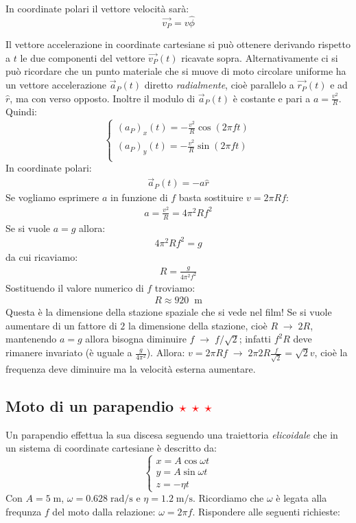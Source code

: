 \documentclass[12pt,a4paper]{book}
\newcommand{\rstar}{ \textcolor{red}{$\star$}}
\begin{document}
In coordinate polari il vettore velocità sarà: 
%
\begin{equation*}
\vec{v_P}= v\hat{\phi}
\end{equation*}
%

Il vettore accelerazione in coordinate cartesiane si può ottenere derivando rispetto a $t$ le due componenti del vettore $\vec{v_P}(t)$ ricavate sopra. Alternativamente
ci si può ricordare che un punto materiale che si muove di moto circolare uniforme ha un vettore accelerazione $\vec{a}_P(t)$ diretto \textit{radialmente}, cioè parallelo a $\vec{r_P}(t)$ e ad $\hat{r}$, ma con verso opposto.  Inoltre il modulo di $\vec{a}_P(t)$ è costante e pari a $a=\frac{v^2}{R}$.  
Quindi: 
%
\begin{equation*}
 \left\{\begin{array}{lr}
  (a_P)_x(t)=-\frac{v^2}{R}  \cos(2 \pi f t)\\
  (a_P)_y(t)= - \frac{v^2}{R}  \sin(2 \pi f t)\\
        \end{array}\right.
\end{equation*}
%
In coordinate polari:
\begin{gather*}
\vec{a}_P(t)=-a\hat{r}
\end{gather*}
%
Se vogliamo esprimere $a$ in funzione di $f$ basta sostituire $v=2 \pi R f$: 
%
\begin{gather*}
a=\frac{v^2}{R}= 4 \pi^2 R f^2
\end{gather*}
%
Se si vuole $a=g$ allora:
%
\begin{gather*}
4 \pi^2 R f^2=g 
\end{gather*}
%
da cui ricaviamo: 
%
\begin{gather*}
R=\frac{g}{4 \pi^2 f^2} 
\end{gather*}
%
Sostituendo il valore numerico di $f$ troviamo: 
%
\begin{gather*}
R \approx 920 \; \; \text{m} 
\end{gather*}
%
Questa è la dimensione della stazione spaziale che si vede nel film! Se si vuole aumentare di un fattore di $2$ la dimensione della stazione, cioè $R \; \rightarrow \;2R$, mantenendo $a=g$ allora bisogna diminuire $f \; \rightarrow \; f/\sqrt{2}$; infatti $f^2 R$ deve rimanere invariato (è uguale a $\frac{g}{4 \pi^2}$). Allora: $v=2 \pi R f \; \rightarrow \;  2 \pi 2R \frac{f}{\sqrt{2}}=\sqrt{2}v$, cioè la frequenza deve diminuire ma la velocità esterna aumentare.

\subsection{Moto di un parapendio \rstar\rstar\rstar} 
Un parapendio effettua la sua discesa seguendo una traiettoria \textit{elicoidale} che in un sistema di coordinate cartesiane è descritto da:
%
\[
\begin{cases}
	x=A\cos\omega t \\
    y=A\sin\omega t \\
    z=-\eta t
\end{cases}
\]
%
Con $A=5\;\text{m}$, $\omega=0.628\;\text{rad/s}$ e $\eta=1.2\;\text{m/s}$. Ricordiamo che $\omega$ è legata alla frequnza $f$ del moto dalla relazione: $\omega=2 \pi f$. Rispondere alle seguenti richieste:
\end{document}
